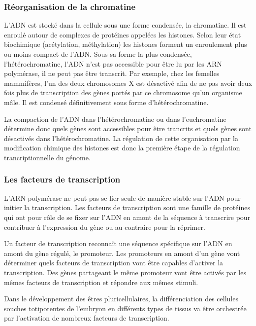 \subsubsection{Réorganisation de la chromatine}

L'ADN est stocké dans la cellule sous une forme condensée, la chromatine. Il est enroulé autour de complexes de protéines appelées les histones. Selon leur état biochimique (acétylation, méthylation) les histones forment un enroulement plus ou moins compact de l'ADN. 
Sous sa forme la plus condensée, l'hétérochromatine, l'ADN n'est pas accessible pour être lu par les ARN polymérase, il ne peut pas être transcrit. Par exemple, chez les femelles mammifères, l'un des deux chromosomes X est désactivé afin de ne pas avoir deux fois plus de transcription des gènes portés par ce chromosome qu'un organisme mâle. Il est condensé définitivement sous forme d'hétérochromatine. 

La compaction de l'ADN dans l'hétérochromatine ou dans l'euchromatine détermine donc quels gènes sont accessibles pour être trancrits et quels gènes sont désactivés dans l'hétérochromatine. 
La régulation de cette organisation par la modification chimique des histones est donc la première étape de la régulation trancriptionnelle du génome. 

\subsubsection{Les facteurs de transcription}

L'ARN polymérase ne peut pas se lier seule de manière stable sur l'ADN pour initier la transcription. 
Les facteurs de transcription sont une famille de protéines qui ont pour rôle de se fixer sur l'ADN en amont de la séquence à transcrire pour contribuer à l'expression du gène ou au contraire pour la réprimer. 

Un facteur de transcription reconnaît une séquence spécifique sur l'ADN en amont du gène régulé, le promoteur. Les promoteurs en amont d'un gène vont déterminer quels facteurs de transcription vont être capables d'activer la transcription. Des gènes partageant le même promoteur vont être activés par les mêmes facteurs de transcription et répondre aux mêmes stimuli.  

Dans le développement des êtres pluricellulaires, la différenciation des cellules souches totipotentes de l'embryon en différents types de tissus va être orchestrée par l'activation de nombreux facteurs de transcription. 

